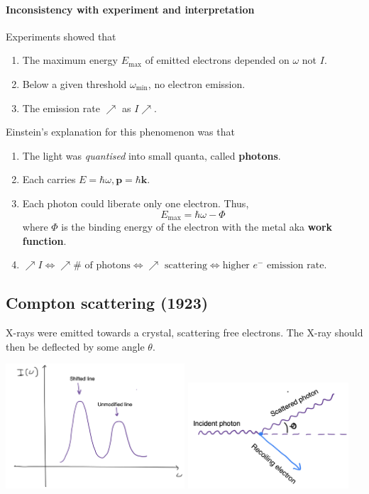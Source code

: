 \documentclass[a4paper,11pt]{article}
\begin{document}
\paragraph{Inconsistency with experiment and interpretation}
Experiments showed that
\begin{enumerate}
	\item The maximum energy \( E_{\max} \) of emitted electrons depended on \( \omega \) not $I$. 
	\item Below a given threshold \( \omega_{\min} \), no electron emission.
	\item The emission rate $ \nearrow $ as $ I \nearrow $.
\end{enumerate}
Einstein's explanation for this phenomenon was that 
\begin{enumerate}
    \item The light was \textit{quantised} into small quanta, called \textbf{photons}.
    \item Each carries \( E = \hbar \omega, \mathbf{p}= \hbar \mathbf{k} \).
    \item Each photon could liberate only one electron.
    Thus,
    \[
        E_{\max} = \hbar \omega - \Phi
    \]
    where \( \Phi \) is the binding energy of the electron with the metal aka \textbf{work function}.
    \item $ \nearrow I \Leftrightarrow \nearrow \# \text{ of photons}\Leftrightarrow \nearrow \text{ scattering}\Leftrightarrow \text{higher }e^- \text{ emission rate}$.
\end{enumerate}

\subsection{Compton scattering (1923)}

X-rays were emitted towards a crystal, scattering free electrons.
The X-ray should then be deflected by some angle \( \theta \).

\begin{center}
    \includegraphics[width=0.5\textwidth]{qm3.png}
    \includegraphics[width=0.45\textwidth]{qm4.png}
\end{center}
\end{document}
